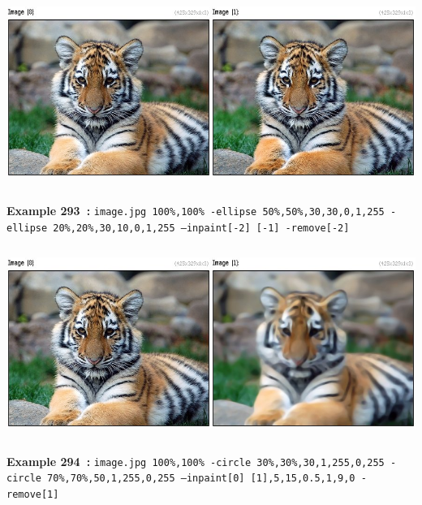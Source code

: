\documentclass[a4paper,11pt,twoside]{book}
\begin{document}
\begin{center}\includegraphics[keepaspectratio=true,height=7cm,width=\textwidth]{img/gmic_def293.jpg}\\
{\footnotesize \textbf{Example 293~:} \texttt{image.jpg 100\%,100\% -ellipse 50\%,50\%,30,30,0,1,255 -ellipse 20\%,20\%,30,10,0,1,255 --inpaint[-2] [-1] -remove[-2]}}
\\\includegraphics[keepaspectratio=true,height=7cm,width=\textwidth]{img/gmic_def294.jpg}\\
{\footnotesize \textbf{Example 294~:} \texttt{image.jpg 100\%,100\% -circle 30\%,30\%,30,1,255,0,255 -circle 70\%,70\%,50,1,255,0,255 --inpaint[0] [1],5,15,0.5,1,9,0 -remove[1]}}
\end{center}
\end{document}
